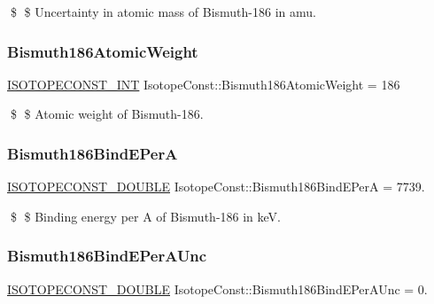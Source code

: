 \$ \$ Uncertainty in atomic mass of Bismuth-\/186 in amu. \mbox{\label{group___isotope_const-_bismuth-_bi186_gabda316fb477cfb4dc9a2c18063a1133a}} 
\subsubsection{\texorpdfstring{Bismuth186\+Atomic\+Weight}{Bismuth186AtomicWeight}}
{\footnotesize\ttfamily \mbox{\hyperlink{group___isotope_const-_macros_ga5f18360b3e99483a35c32d789e62621c}{I\+S\+O\+T\+O\+P\+E\+C\+O\+N\+S\+T\+\_\+\+I\+NT}} Isotope\+Const\+::\+Bismuth186\+Atomic\+Weight = 186}

\$ \$ Atomic weight of Bismuth-\/186. \mbox{\label{group___isotope_const-_bismuth-_bi186_ga8dc77cee63cac04113de2a253507bd28}} 
\subsubsection{\texorpdfstring{Bismuth186\+Bind\+E\+PerA}{Bismuth186BindEPerA}}
{\footnotesize\ttfamily \mbox{\hyperlink{group___isotope_const-_macros_ga8f45a7272ce02c0b4c65c44636ed719a}{I\+S\+O\+T\+O\+P\+E\+C\+O\+N\+S\+T\+\_\+\+D\+O\+U\+B\+LE}} Isotope\+Const\+::\+Bismuth186\+Bind\+E\+PerA = 7739.}

\$ \$ Binding energy per A of Bismuth-\/186 in keV. \mbox{\label{group___isotope_const-_bismuth-_bi186_ga9c11d278a3c7e1381cdd6ccc9c420507}} 
\subsubsection{\texorpdfstring{Bismuth186\+Bind\+E\+Per\+A\+Unc}{Bismuth186BindEPerAUnc}}
{\footnotesize\ttfamily \mbox{\hyperlink{group___isotope_const-_macros_ga8f45a7272ce02c0b4c65c44636ed719a}{I\+S\+O\+T\+O\+P\+E\+C\+O\+N\+S\+T\+\_\+\+D\+O\+U\+B\+LE}} Isotope\+Const\+::\+Bismuth186\+Bind\+E\+Per\+A\+Unc = 0.}

